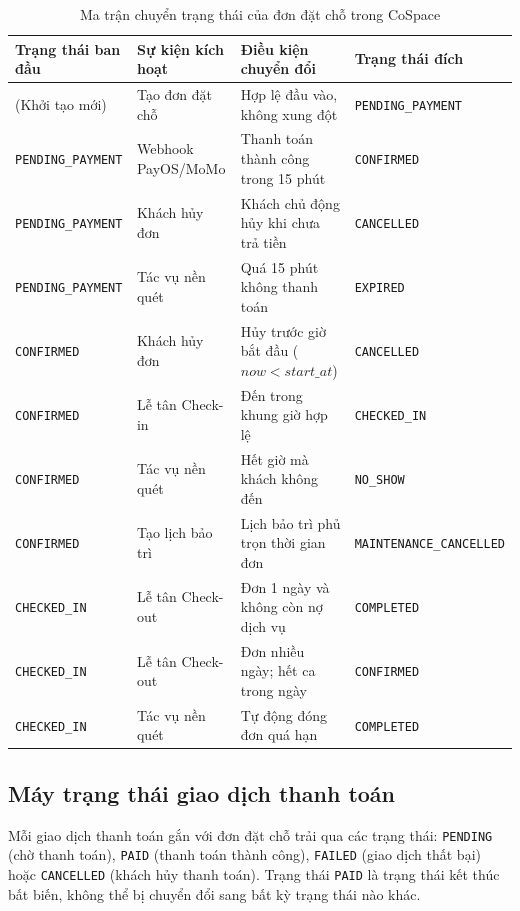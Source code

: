 \begin{table}[H]
\centering
\caption{Ma trận chuyển trạng thái của đơn đặt chỗ trong CoSpace}
\label{tab:state_booking_matrix}
\small
\renewcommand{\arraystretch}{1.2}
\begin{tabular}{|p{3.2cm}|p{3.2cm}|p{4.2cm}|p{3.4cm}|}
\hline
\textbf{Trạng thái ban đầu} & \textbf{Sự kiện kích hoạt} & \textbf{Điều kiện chuyển đổi} & \textbf{Trạng thái đích} \\
\hline
(Khởi tạo mới) & Tạo đơn đặt chỗ & Hợp lệ đầu vào, không xung đột & \texttt{PENDING\_PAYMENT} \\
\hline
\texttt{PENDING\_PAYMENT} & Webhook PayOS/MoMo & Thanh toán thành công trong 15 phút & \texttt{CONFIRMED} \\
\hline
\texttt{PENDING\_PAYMENT} & Khách hủy đơn & Khách chủ động hủy khi chưa trả tiền & \texttt{CANCELLED} \\
\hline
\texttt{PENDING\_PAYMENT} & Tác vụ nền quét & Quá 15 phút không thanh toán & \texttt{EXPIRED} \\
\hline
\texttt{CONFIRMED} & Khách hủy đơn & Hủy trước giờ bắt đầu ($now < start\_at$) & \texttt{CANCELLED} \\
\hline
\texttt{CONFIRMED} & Lễ tân Check-in & Đến trong khung giờ hợp lệ & \texttt{CHECKED\_IN} \\
\hline
\texttt{CONFIRMED} & Tác vụ nền quét & Hết giờ mà khách không đến & \texttt{NO\_SHOW} \\
\hline
\texttt{CONFIRMED} & Tạo lịch bảo trì & Lịch bảo trì phủ trọn thời gian đơn & \texttt{MAINTENANCE\_CANCELLED} \\
\hline
\texttt{CHECKED\_IN} & Lễ tân Check-out & Đơn 1 ngày và không còn nợ dịch vụ & \texttt{COMPLETED} \\
\hline
\texttt{CHECKED\_IN} & Lễ tân Check-out & Đơn nhiều ngày; hết ca trong ngày & \texttt{CONFIRMED} \\
\hline
\texttt{CHECKED\_IN} & Tác vụ nền quét & Tự động đóng đơn quá hạn & \texttt{COMPLETED} \\
\hline
\end{tabular}
\end{table}

\subsection{Máy trạng thái giao dịch thanh toán}
Mỗi giao dịch thanh toán gắn với đơn đặt chỗ trải qua các trạng thái: \texttt{PENDING} (chờ thanh toán), \texttt{PAID} (thanh toán thành công), \texttt{FAILED} (giao dịch thất bại) hoặc \texttt{CANCELLED} (khách hủy thanh toán). Trạng thái \texttt{PAID} là trạng thái kết thúc bất biến, không thể bị chuyển đổi sang bất kỳ trạng thái nào khác.

